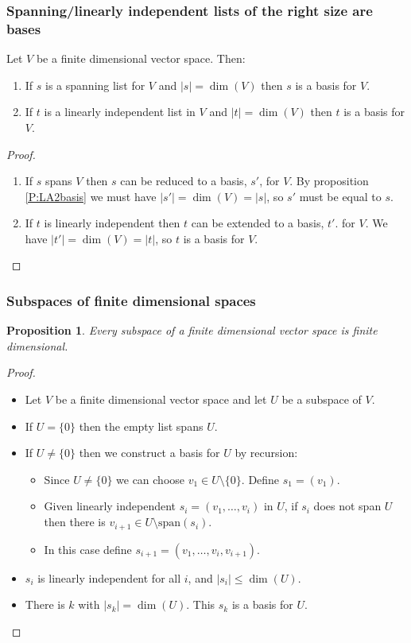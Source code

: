 \documentclass[handout]{beamer}
\newtheorem{proposition}[theorem]{Proposition}
\newcommand{\spa}{\mathrm{span}}
\begin{document}
\begin{frame}
\frametitle{Spanning/linearly independent lists of the right size are bases}
\begin{theorem}
Let $V$ be a finite dimensional vector space. Then:
\begin{enumerate}
\item If $s$ is a spanning list for $V$ and $|s|=\dim(V)$ then $s$ is a basis for $V$.
\item If $t$ is a linearly independent list in $V$ and $|t|=\dim(V)$ then $t$ is a basis for $V$. 
\end{enumerate}
\end{theorem}
\begin{proof}
\begin{enumerate}
\item If $s$ spans $V$ then $s$ can be reduced to a basis, $s'$, for $V$. By proposition \ref{P:LA2basis} we must have $|s'| = \dim(V) = |s|$, so $s'$ must be equal to $s$.
\vspace{0.3cm}
\item If $t$ is linearly independent then $t$ can be extended to a basis, $t'$. for $V$. We have $|t'|=\dim(V)=|t|$, so $t$ is a basis for $V$. 
\end{enumerate}  
\end{proof}
\end{frame}

\begin{frame}
\frametitle{Subspaces of finite dimensional spaces}
\begin{proposition}\label{P:LA2subbase}
Every subspace of a finite dimensional vector space is finite dimensional.
\end{proposition}
\begin{proof}
\begin{itemize}
\item Let $V$ be a finite dimensional vector space and let $U$ be a subspace of $V$. 
\item If $U=\{0\}$ then the empty list spans $U$. 
\item If $U\neq \{0\}$ then we construct a basis for $U$ by recursion:
\begin{itemize}
\item Since $U\neq\{0\}$ we can choose $v_1 \in U\setminus\{0\}$. Define $s_1 = (v_1).$
\item Given linearly independent $s_i = (v_1,\ldots, v_i)$ in $U$, if $s_i$ does not span $U$ then there is $v_{i+1}\in U\setminus \spa(s_i)$. 
\item In this case define $s_{i+1} = (v_1,\ldots, v_i, v_{i+1})$.  
\end{itemize} 
\item $s_i$ is linearly independent for all $i$, and $|s_i|\leq \dim(U)$.
\item There is $k$ with $|s_k|= \dim(U)$. This $s_k$ is a basis for $U$.
\end{itemize}
\end{proof}
\end{frame}
\end{document}
